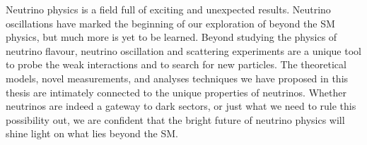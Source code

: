 Neutrino physics is a field full of exciting and unexpected results. Neutrino oscillations have marked the beginning of our exploration of beyond the SM physics, but much more is yet to be learned. Beyond studying the physics of neutrino flavour, neutrino oscillation and scattering experiments are a unique tool to probe the weak interactions and to search for new particles. The theoretical models, novel measurements, and analyses techniques we have proposed in this thesis are intimately connected to the unique properties of neutrinos. Whether neutrinos are indeed a gateway to dark sectors, or just what we need to rule this possibility out, we are confident that the bright future of neutrino physics will shine light on what lies beyond the SM.